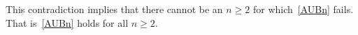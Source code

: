 \begin{problem}
\begin{solution}
This contradiction implies that there cannot be an  $n \geq 2$ for
which~\eqref{AUBn} fails.  That is~\eqref{AUBn} holds for all $n \geq 2$.

\end{solution}
\end{problem}
